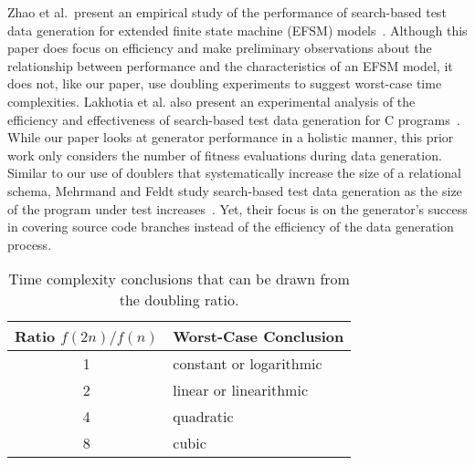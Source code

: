 Zhao et al.\ present an empirical study of the performance of search-based test data generation for extended finite
state machine (EFSM) models~\cite{zhao2010}. Although this paper does focus on efficiency and make preliminary
observations about the relationship between performance and the characteristics of an EFSM model, it does not, like our
paper, use doubling experiments to suggest worst-case time complexities. Lakhotia et al. also present an experimental
analysis of the efficiency and effectiveness of search-based test data generation for C programs~\cite{lakhotia2013}.
While our paper looks at generator performance in a holistic manner, this prior work only considers the number of
fitness evaluations during data generation. Similar to our use of doublers that systematically increase the size of a
relational schema, Mehrmand and Feldt study search-based test data generation as the size of the
program under test increases~\cite{mehrmand2010}. Yet, their focus is on the generator's success in covering source code
branches instead of the efficiency of the data generation process.



\begin{table}[t]

  \begin{center}

    \begin{tabular}{c|l}
      Ratio $f(2n)/f(n)$ & Worst-Case Conclusion              \\ \hline
      1                  & constant or logarithmic \\
      2                  & linear or linearithmic  \\
      4                  & quadratic               \\
      8                  & cubic                   \\
    \end{tabular}

  \end{center}
  \vspace*{-.15in}

  \caption{Time complexity conclusions that can be drawn from the doubling ratio.}\label{table:ratios}
  \vspace*{-.30in}

\end{table}
